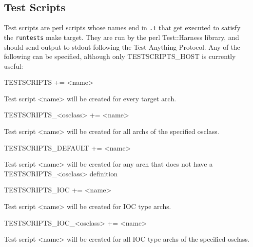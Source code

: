 \subsection{Test Scripts}

Test scripts are perl scripts whose names end in \verb|.t| that get executed to satisfy the \verb|runtests| make target. They are run 
by the perl Test::Harness library, and should send output to stdout following the Test Anything Protocol. Any of the 
following can be specified, although only TESTSCRIPTS\_HOST is currently useful:

\begin{description}\item {}TESTSCRIPTS += \textless{}name\textgreater{}

\end{description}Test script \textless{}name\textgreater{} will be created for every target arch.

\begin{description}\item TESTSCRIPTS\_\textless{}osclass\textgreater{} += \textless{}name\textgreater{}

\end{description}Test script \textless{}name\textgreater{} will be created for all archs of the specified osclass.

\begin{description}\item TESTSCRIPTS\_DEFAULT += \textless{}name\textgreater{}

\end{description}Test script \textless{}name\textgreater{} will be created for any arch that does not have a TESTSCRIPTS\_\textless{}osclass\textgreater{} definition

\begin{description}\item 

\item {}TESTSCRIPTS\_IOC += \textless{}name\textgreater{}

\end{description}Test script \textless{}name\textgreater{} will be created for IOC type archs.

\begin{description}\item TESTSCRIPTS\_IOC\_\textless{}osclass\textgreater{} += \textless{}name\textgreater{}

\end{description}Test script \textless{}name\textgreater{} will be created for all IOC type archs of the specified osclass.

